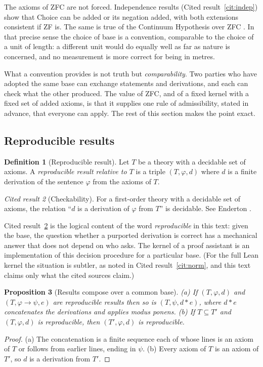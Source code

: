 \documentclass[11pt]{article}
\theoremstyle{definition}
\newtheorem{definition}{Definition}[section]
\theoremstyle{plain}
\newtheorem{proposition}[definition]{Proposition}
\theoremstyle{remark}
\newtheorem{cited}[definition]{Cited result}
\begin{document}
The axioms of ZFC are not forced. Independence results (Cited result~\ref{cit:indep}) show that Choice can be added or its negation added, with both extensions consistent if ZF is. The same is true of the Continuum Hypothesis over ZFC \cite{Cohen63}. In that precise sense the choice of base is a convention, comparable to the choice of a unit of length: a different unit would do equally well as far as nature is concerned, and no measurement is more correct for being in metres.

What a convention provides is not truth but \emph{comparability}. Two parties who have adopted the same base can exchange statements and derivations, and each can check what the other produced. The value of ZFC, and of a fixed kernel with a fixed set of added axioms, is that it supplies one rule of admissibility, stated in advance, that everyone can apply. The rest of this section makes the point exact.

\subsection{Reproducible results}

\begin{definition}[Reproducible result]\label{def:repro}
Let $T$ be a theory with a decidable set of axioms. A \emph{reproducible result relative to $T$} is a triple $(T,\varphi,d)$ where $d$ is a finite derivation of the sentence $\varphi$ from the axioms of $T$.
\end{definition}

\begin{cited}[Checkability]\label{cit:checkable}
For a first-order theory with a decidable set of axioms, the relation ``$d$ is a derivation of $\varphi$ from $T$'' is decidable. See Enderton \cite[Ch.~2 and~3]{Enderton01}.
\end{cited}

Cited result~\ref{cit:checkable} is the logical content of the word \emph{reproducible} in this text: given the base, the question whether a purported derivation is correct has a mechanical answer that does not depend on who asks. The kernel of a proof assistant is an implementation of this decision procedure for a particular base. (For the full Lean kernel the situation is subtler, as noted in Cited result~\ref{cit:norm}, and this text claims only what the cited sources claim.)

\begin{proposition}[Results compose over a common base]\label{prop:compose}
(a) If $(T,\varphi,d)$ and $(T,\varphi\to\psi,e)$ are reproducible results then so is $(T,\psi,d\ast e)$, where $d\ast e$ concatenates the derivations and applies modus ponens.
(b) If $T\subseteq T'$ and $(T,\varphi,d)$ is reproducible, then $(T',\varphi,d)$ is reproducible.
\end{proposition}
\begin{proof}
(a) The concatenation is a finite sequence each of whose lines is an axiom of $T$ or follows from earlier lines, ending in $\psi$. (b) Every axiom of $T$ is an axiom of $T'$, so $d$ is a derivation from $T'$.
\end{proof}
\end{document}
